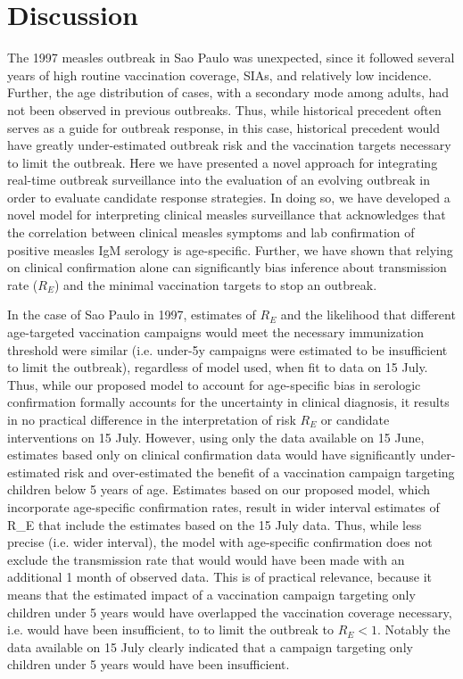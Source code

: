 \section{Discussion}\label{discussion}

The 1997 measles outbreak in Sao Paulo was unexpected, since it followed several
years of high routine vaccination coverage, SIAs, and relatively low
incidence. Further, the age distribution of cases, with a secondary mode
among adults, had not been observed in previous outbreaks. Thus, while
historical precedent often serves as a guide for outbreak response, in
this case, historical precedent would have greatly under-estimated
outbreak risk and the vaccination targets necessary to limit the
outbreak. Here we have presented a novel approach for integrating
real-time outbreak surveillance into the evaluation of an evolving
outbreak in order to evaluate candidate response strategies. In doing
so, we have developed a novel model for interpreting clinical measles
surveillance that acknowledges that the correlation between clinical
measles symptoms and lab confirmation of positive measles IgM serology
is age-specific. Further, we have shown that relying on clinical
confirmation alone can significantly bias inference about transmission
rate (\(R_E\)) and the minimal vaccination targets to stop an outbreak.

In the case of Sao Paulo in 1997, estimates of \(R_E\) and the likelihood
that different age-targeted vaccination campaigns would meet the
necessary immunization threshold were similar (i.e. under-5y campaigns
were estimated to be insufficient to limit the outbreak), regardless of
model used, when fit to data on 15 July. Thus, while our proposed model
to account for age-specific bias in serologic confirmation formally
accounts for the uncertainty in clinical diagnosis, it results in no
practical difference in the interpretation of risk \(R_E\) or candidate
interventions on 15 July. However, using only the data available on 15
June, estimates based only on clinical confirmation data would have
significantly under-estimated risk and over-estimated the benefit of a
vaccination campaign targeting children below 5 years of age. Estimates
based on our proposed model, which incorporate age-specific confirmation
rates, result in wider interval estimates of R\_E that include the
estimates based on the 15 July data. Thus, while less precise (i.e.
wider interval), the model with age-specific confirmation does not
exclude the transmission rate that would would have been made with an
additional 1 month of observed data. This is of practical relevance,
because it means that the estimated impact of a vaccination campaign
targeting only children under 5 years would have overlapped the
vaccination coverage necessary, i.e. would have been insufficient, to to
limit the outbreak to \(R_E \lt 1\). Notably the data available on 15
July clearly indicated that a campaign targeting only children under 5
years would have been insufficient.

